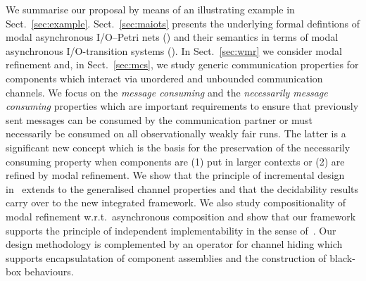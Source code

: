 We summarise our proposal by means of an illustrating example in Sect.~\ref{sec:example}.
Sect.~\ref{sec:maiots} presents the underlying formal defintions of modal asynchronous I/O--Petri nets \linebreak (\MAIOPNs) 
and their semantics in terms of modal asynchronous I/O-transition systems (\MAIOTSs).
In Sect.~\ref{sec:wmr} we consider modal refinement and, in Sect.~\ref{sec:mcs}, we study
generic communication properties for components which interact via unordered and unbounded
communication channels. We focus on the \emph{message consuming} and the
\emph{necessarily message consuming} properties which are important requirements
to ensure that previously sent messages can be consumed by the communication
partner or must necessarily be consumed on all observationally weakly fair runs.
The latter is a significant new concept
which is the basis for the preservation of the necessarily consuming property
when components are (1) put in larger contexts or (2) are refined by modal refinement.
We show that the principle of incremental design in~\cite{haddad-et-al-2013}
extends to the generalised channel properties and that the decidability results
carry over to the new integrated framework.
We also study compositionality of modal refinement w.r.t.\ asynchronous composition
and show that our framework supports the principle of independent implementability in the sense of~\cite{alfaroHenzinger2005}.
Our design methodology is complemented by an operator for channel hiding
which supports  encapsulatation of component assemblies and the construction of black-box behaviours.





